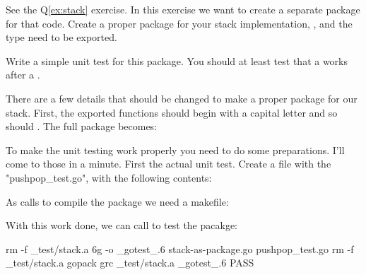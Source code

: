 \begin{Exercise}[title={Stack as package},difficulty=2]
\label{ex:stack-package}
\Question\label{ex:stack-package q1} 
See the Q\ref{ex:stack} exercise. In this exercise we want to create
a separate package for that code.
Create a proper package for your
stack implementation, ,  and the  type need to be
exported.

\Question\label{ex:stack-package q2} Write a simple unit test for this package.
You should at least test that a  works after a .

\end{Exercise}

\begin{Answer}
\Question There are a few details that should be changed to make a proper package
for our stack. First, the exported functions should begin with a capital 
letter and so should . The full package becomes:


\Question To make the unit testing work properly you need to do some
preparations. I'll come to those in a minute. First the actual unit test.
Create a file with the "pushpop\_test.go", with the following contents:

As  calls  to compile the package we need a makefile:

With this work done, we can call  to test the pacakge:

\begin{display}
\pr {}
rm -f _test/stack.a
6g  -o _gotest_.6 stack-as-package.go  pushpop_test.go
rm -f _test/stack.a
gopack grc _test/stack.a _gotest_.6 
PASS
\end{display}

\end{Answer}
